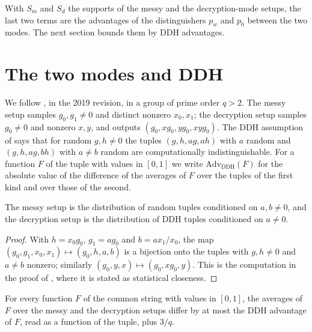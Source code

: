 \begin{remark}
  With $S_m$ and $S_d$ the supports of the messy and the decryption-mode setups, the last two terms
  are the advantages of the distinguishers $p_w$ and $p_0$ between the two modes. The next section
  bounds them by DDH advantages.
\end{remark}

\section{The two modes and DDH}

We follow \cite[Sect.~5.1 and 5.3]{PVW08}, in the 2019 revision, in a group of prime order $q > 2$.
The messy setup samples $g_0, g_1 \neq 0$ and distinct nonzero $x_0, x_1$; the decryption setup
samples $g_0 \neq 0$ and nonzero $x, y$, and outputs $(g_0, x g_0, y g_0, x y g_0)$. The DDH
assumption of \cite[Sect.~5.1]{PVW08} says that for random $g, h \neq 0$ the tuples
$(g, h, a g, a h)$ with $a$ random and $(g, h, a g, b h)$ with $a \neq b$ random are
computationally indistinguishable. For a function $F$ of the tuple with values in $[0, 1]$ we write
$\mathrm{Adv}_{\mathrm{DDH}}(F)$ for the absolute value of the difference of the averages of $F$
over the tuples of the first kind and over those of the second.

\begin{lemma}
  \label{lem:pvw-tuples}
  \leanok
  The messy setup is the distribution of random tuples conditioned on $a, b \neq 0$, and the
  decryption setup is the distribution of DDH tuples conditioned on $a \neq 0$.
\end{lemma}

\begin{proof}
  \leanok
  With $h = x_0 g_0$, $g_1 = a g_0$ and $b = a x_1 / x_0$, the map
  $(g_0, g_1, x_0, x_1) \mapsto (g_0, h, a, b)$ is a bijection onto the tuples with $g, h \neq 0$
  and $a \neq b$ nonzero; similarly $(g_0, y, x) \mapsto (g_0, x g_0, y)$. This is the computation
  in the proof of \cite[Theorem~5.2]{PVW08}, where it is stated as statistical closeness.
\end{proof}

\begin{theorem}
  \label{thm:pvw-modes}
  \leanok
  For every function $F$ of the common string with values in $[0, 1]$, the averages of $F$ over
  the messy and the decryption setups differ by at most the DDH advantage of $F$, read as a
  function of the tuple, plus $3/q$.
\end{theorem}

